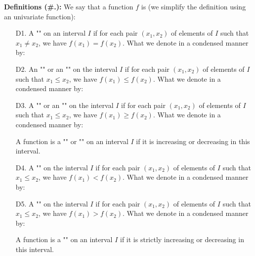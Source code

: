 	\textbf{Definitions (\#\thesection.\mydef):} We say that a function $f$ is (we simplify the definition using an univariate function)\label{functions monotonicities}:
	\begin{itemize}
		\item[D1.] A "" on an interval $I$ if for each pair $(x_1,x_2)$ of elements of $I$ such that $x_1\neq x_2$, we have $f(x_1)=f(x_2)$. What we denote in a condensed manner by:
		
		
		\item[D2.] An "" or an "" on the interval $I$ if for each pair $(x_1,x_2)$ of elements of $I$ such that $x_1\leq x_2$, we have $f(x_1)\leq f(x_2)$. What we denote in a condensed manner by:
		
		
		\item[D3.] A "" or an "" on the interval $I$ if for each pair $(x_1,x_2)$ of elements of $I$ such that $x_1\leq x_2$, we have $f(x_1)\geq f(x_2)$. What we denote in a condensed manner by:
		
		\begin{tcolorbox}[title=Remark,arc=10pt,breakable,drop lifted shadow,
  skin=enhanced,
  skin first is subskin of={enhancedfirst}{arc=10pt,no shadow},
  skin middle is subskin of={enhancedmiddle}{arc=10pt,no shadow},
  skin last is subskin of={enhancedlast}{drop lifted shadow}]
		A function is a "" or "" on an interval $I$ if it is increasing or decreasing in this interval.
		\end{tcolorbox}
		
		\item[D4.] A "" on the interval $I$ if for each pair $(x_1,x_2)$ of elements of $I$ such that $x_1\leq x_2$, we have $f(x_1)< f(x_2)$. What we denote in a condensed manner by:
		
		
		\item[D5.] A "" on the interval $I$ if for each pair $(x_1,x_2)$ of elements of $I$ such that $x_1\leq x_2$, we have $f(x_1)> f(x_2)$. What we denote in a condensed manner by:
		
		\begin{tcolorbox}[title=Remark,arc=10pt,breakable,drop lifted shadow,
  skin=enhanced,
  skin first is subskin of={enhancedfirst}{arc=10pt,no shadow},
  skin middle is subskin of={enhancedmiddle}{arc=10pt,no shadow},
  skin last is subskin of={enhancedlast}{drop lifted shadow}]
		A function is a "" on an interval $I$ if it is strictly increasing or decreasing in this interval.
		\end{tcolorbox}
	\end{itemize}
